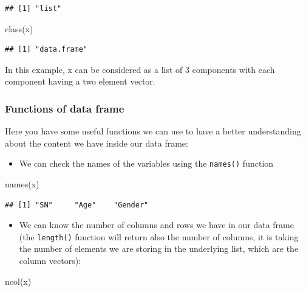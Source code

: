 \documentclass[
]{book}
\newenvironment{Shaded}{\begin{snugshade}}{\end{snugshade}}
\newcommand{\FunctionTok}[1]{\textcolor[rgb]{0.00,0.00,0.00}{#1}}
\newcommand{\NormalTok}[1]{#1}
\providecommand{\tightlist}{%
  \setlength{\itemsep}{0pt}\setlength{\parskip}{0pt}}
\begin{document}
\begin{verbatim}
## [1] "list"
\end{verbatim}

\begin{Shaded}
\begin{Highlighting}[]
\FunctionTok{class}\NormalTok{(x)}
\end{Highlighting}
\end{Shaded}

\begin{verbatim}
## [1] "data.frame"
\end{verbatim}

In this example, x can be considered as a list of 3 components with each component having a two element vector.

\hypertarget{functions-of-data-frame}{%
\subsubsection{Functions of data frame}\label{functions-of-data-frame}}

Here you have some useful functions we can use to have a better understanding about the content we have inside our data frame:

\begin{itemize}
\tightlist
\item
  We can check the names of the variables using the \texttt{names()} function
\end{itemize}

\begin{Shaded}
\begin{Highlighting}[]
\FunctionTok{names}\NormalTok{(x)}
\end{Highlighting}
\end{Shaded}

\begin{verbatim}
## [1] "SN"     "Age"    "Gender"
\end{verbatim}

\begin{itemize}
\tightlist
\item
  We can know the number of columns and rows we have in our data frame (the \texttt{length()} function will return also the number of columns, it is taking the number of elements we are storing in the underlying list, which are the column vectors):
\end{itemize}

\begin{Shaded}
\begin{Highlighting}[]
\FunctionTok{ncol}\NormalTok{(x)}
\end{Highlighting}
\end{Shaded}
\end{document}
